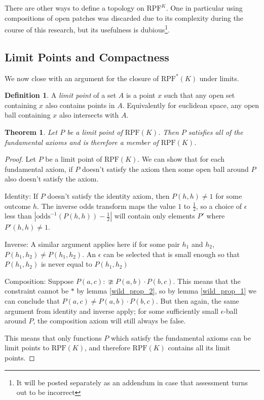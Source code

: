 \documentclass[twoside]{article}
\theoremstyle{plain}%
\newtheorem{theorem}{Theorem}[section]
\theoremstyle{definition}
\newtheorem{definition}{Definition}[section]
\theoremstyle{remark}
\begin{document}
There are other ways to define a topology on \(\text{RPF}^K\). One in particular using compositions of open patches was discarded due to its complexity during the course of this research, but its usefulness is dubious\footnote{It will be posted separately as an addendum in case that assessment turns out to be incorrect}.

\subsection{Limit Points and Compactness}

We now close with an argument for the closure of \(\text{RPF}^{\ast}(K)\) under limits.

\begin{definition}
A \textit{limit point} of a set \(A\) is a point \(x\) such that any open set containing \(x\) also contains points in \(A\). Equivalently for euclidean space, any open ball containing \(x\) also intersects with \(A\).
\end{definition}

\begin{theorem}
\label{thm:rpf_closed}
Let \(P\) be a \textit{limit point} of \(\text{RPF}(K)\). Then \(P\) satisfies all of the fundamental axioms and is therefore a member of \(\text{RPF}(K)\).
\end{theorem}

\begin{proof}
Let \(P\) be a limit point of \(\text{RPF}(K)\). We can show that for each fundamental axiom, if \(P\) doesn't satisfy the axiom then some open ball around \(P\) also doesn't satisfy the axiom.

Identity: If \(P\) doesn't satisfy the identity axiom, then \(P(h, h) \neq 1\) for some outcome \(h\). The inverse odds transform maps the value \(1\) to \(\frac{1}{2}\), so a choice of \(\epsilon\) less than \(|\text{odds}^{-1}(P(h, h)) - \frac{1}{2}|\) will contain only elements \(P'\) where \(P'(h, h) \neq 1\).

Inverse: A similar argument applies here if for some pair \(h_1\) and \(h_2\), \(P(h_1, h_2) \neq P(h_1, h_2)\). An \(\epsilon\) can be selected that is small enough so that \(P(h_1, h_2)\) is never equal to \(P(h_1, h_2)\)

Composition: Suppose \(P(a, c) :\ncong P(a, b) \cdot P(b, c) \). This means that the constraint cannot be \(\ast\) by lemma \ref{wild_prop_2}, so by lemma \ref{wild_prop_1} we can conclude that \(P(a, c) \neq P(a, b) \cdot P(b, c) \). But then again, the same argument from identity and inverse apply; for some sufficiently small \(\epsilon\)-ball around \(P\), the composition axiom will still always be false.

This means that only functions \(P\) which satisfy the fundamental axioms can be limit points to \(\text{RPF}(K)\), and therefore \(\text{RPF}(K)\) contains all its limit points.
\end{proof}
\end{document}
